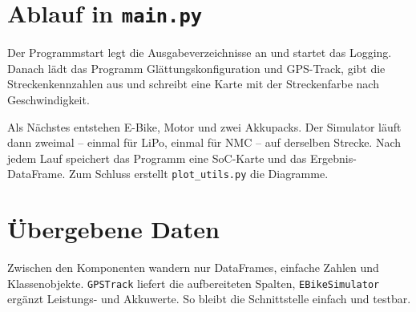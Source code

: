 \section{Ablauf in \texttt{main.py}}

Der Programmstart legt die Ausgabeverzeichnisse an und startet das Logging. Danach lädt das Programm Glättungskonfiguration und GPS-Track, gibt die Streckenkennzahlen aus und schreibt eine Karte mit der Streckenfarbe nach Geschwindigkeit.

Als Nächstes entstehen E-Bike, Motor und zwei Akkupacks. Der Simulator läuft dann zweimal -- einmal für LiPo, einmal für NMC -- auf derselben Strecke. Nach jedem Lauf speichert das Programm eine SoC-Karte und das Ergebnis-DataFrame. Zum Schluss erstellt \texttt{plot\_utils.py} die Diagramme.

\section{Übergebene Daten}

Zwischen den Komponenten wandern nur DataFrames, einfache Zahlen und Klassenobjekte. \texttt{GPSTrack} liefert die aufbereiteten Spalten, \texttt{EBikeSimulator} ergänzt Leistungs- und Akkuwerte. So bleibt die Schnittstelle einfach und testbar.
